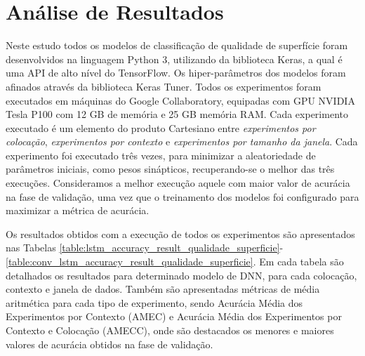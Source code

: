\newpage
\section{Análise de Resultados}

Neste estudo todos os modelos de classificação de qualidade de superfície foram desenvolvidos na linguagem Python 3, utilizando da biblioteca Keras, a qual é uma API de alto nível do TensorFlow. Os hiper-parâmetros dos modelos foram afinados através da biblioteca Keras Tuner. Todos os experimentos foram executados em máquinas do Google Collaboratory, equipadas com GPU NVIDIA Tesla P100 com 12 GB de memória e 25 GB memória RAM. Cada experimento executado é um elemento do produto Cartesiano entre \emph{experimentos por colocação}, \emph{experimentos por contexto} e \emph{experimentos por tamanho da janela}. Cada experimento foi executado três vezes, para minimizar a aleatoriedade de parâmetros iniciais, como pesos sinápticos, recuperando-se o melhor das três execuções. Consideramos a melhor execução aquele com maior valor de acurácia na fase de validação, uma vez que o treinamento dos modelos foi configurado para maximizar a métrica de acurácia.

Os resultados obtidos com a execução de todos os experimentos são apresentados nas Tabelas \ref{table:lstm_accuracy_result_qualidade_superficie}-\ref{table:conv_lstm_accuracy_result_qualidade_superficie}. Em cada tabela são detalhados os resultados para determinado modelo de DNN, para cada colocação, contexto e janela de dados. Também são apresentadas métricas de média aritmética para cada tipo de experimento, sendo Acurácia Média dos Experimentos por Contexto (AMEC) e Acurácia Média dos Experimentos por Contexto e Colocação (AMECC), onde são destacados os menores e maiores valores de acurácia obtidos na fase de validação.

